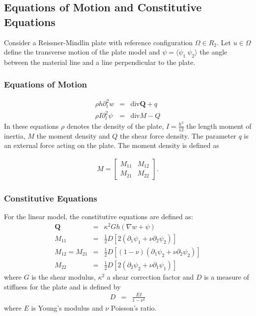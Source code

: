 \documentclass[../../main.tex]{subfiles}
\begin{document}
	\subsection{Equations of Motion and Constitutive Equations}\label{ssec:P_Model:EquationsOfMotion+ConstitutiveEquation}
	Consider a Reissner-Mindlin plate with reference configuration $\Omega \in R_2$. Let $u \in \Omega$ define the transverse motion of the plate model and $\psi = \langle \psi_1 \ \psi_2 \rangle$ the angle between the material line and a line perpendicular to the plate.
	
	\subsubsection*{Equations of Motion}\label{sssec:P_Model:EquationsOfMotion}
	\begin{eqnarray}
		\rho h \partial_t^2 w & = & \textrm{div} \mathbf{Q} + q \label{eq:P_Model:EM1}\\
		\rho I \partial_t^2 {\psi} & = & \textrm{div} M - Q \label{P2}\label{eq:P_Model:EM1}
	\end{eqnarray} \label{sym:bfQ}
	In these equations $\rho$ denotes the density of the plate, $\displaystyle I = \frac{h^3}{12}$ the length moment of inertia, $M$ the moment density and $Q$ the shear force density. The parameter $q$ is an external force acting on the plate. The moment density is defined as
	
	\begin{eqnarray*}
		M = 
		\begin{bmatrix}
			M_{11} & M_{12}\\
			M_{21} & M_{22}
		\end{bmatrix}.
	\end{eqnarray*}
	
	\subsubsection*{Constitutive Equations}\label{sssec:P_Model:ConstitutiveEquation}
	For the linear model, the constitutive equations are defined as:
	\begin{eqnarray}
		\mathbf{Q} & = & \kappa^2 G h(\nabla w + \psi) \label{eq:P_Model:CE1} \\
		M_{11} & = & \frac{1}{2} D \left[2(\partial_1 \psi_1 + \nu \partial_2 \psi_2)\right]  \label{eq:P_Model:CE2}\\
		M_{12} =  M_{21} & = & \frac{1}{2} D \left[(1-\nu)(\partial_1 \psi_2 + \nu \partial_2 \psi_2)\right] \label{eq:P_Model:CE3} \\
		M_{22} & = & \frac{1}{2} D \left[2(\partial_2 \psi_2 + \nu \partial_1 \psi_1)\right] \label{eq:P_Model:CE4}
	\end{eqnarray}
	where $G$ is the shear modulus, $\kappa^2$ a shear correction factor and $D$ is a measure of stiffness for the plate and is defined by
	\begin{eqnarray*}
		D & = & \frac{EI}{1-\nu^2}
	\end{eqnarray*}
	where $E$ is Young's modulus and $\nu$ Poisson's ratio.\\
	
\end{document}
